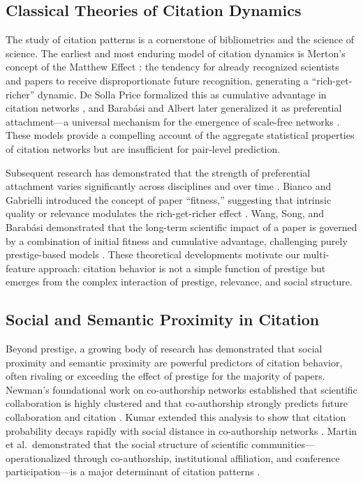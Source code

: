 \documentclass[12pt,a4paper]{article}
\begin{document}
\subsection{Classical Theories of Citation Dynamics}

The study of citation patterns is a cornerstone of bibliometrics and the science
of science. The earliest and most enduring model of citation dynamics is Merton's
concept of the Matthew Effect \citep{merton1968matthew}: the tendency for already
recognized scientists and papers to receive disproportionate future recognition,
generating a ``rich-get-richer'' dynamic. De Solla Price formalized this as
cumulative advantage in citation networks \citep{de1976general}, and Barab\'asi
and Albert later generalized it as preferential attachment---a universal mechanism
for the emergence of scale-free networks \citep{barabasi1999emergence}. These
models provide a compelling account of the aggregate statistical properties of
citation networks but are insufficient for pair-level prediction.

Subsequent research has demonstrated that the strength of preferential attachment
varies significantly across disciplines and over time \citep{wang2008measuring}.
Bianco and Gabrielli introduced the concept of paper ``fitness,'' suggesting that
intrinsic quality or relevance modulates the rich-get-richer effect
\citep{bianco2008fitness}. Wang, Song, and Barab\'asi demonstrated that the
long-term scientific impact of a paper is governed by a combination of initial
fitness and cumulative advantage, challenging purely prestige-based models
\citep{wang2013quantifying}. These theoretical developments motivate our
multi-feature approach: citation behavior is not a simple function of prestige
but emerges from the complex interaction of prestige, relevance, and social structure.

\subsection{Social and Semantic Proximity in Citation}

Beyond prestige, a growing body of research has demonstrated that social proximity
and semantic proximity are powerful predictors of citation behavior, often rivaling
or exceeding the effect of prestige for the majority of papers. Newman's foundational
work on co-authorship networks established that scientific collaboration is highly
clustered and that co-authorship strongly predicts future collaboration and citation
\citep{newman2004coauthorship}. Kumar extended this analysis to show that citation
probability decays rapidly with social distance in co-authorship networks
\citep{kumar2015co}. Martin et al.\ demonstrated that the social structure of
scientific communities---operationalized through co-authorship, institutional
affiliation, and conference participation---is a major determinant of citation
patterns \citep{martin2013coauthorship}.
\end{document}
